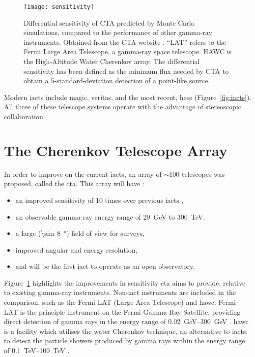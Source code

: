 \begin{figure}
	\centering\texttt{[image: sensitivity]} 
	\caption[Differential sensitivity of CTA.]{Differential sensitivity of CTA predicted by Monte Carlo simulations, compared to the performance of other gamma-ray instruments. Obtained from the CTA website \cite{cta-performance}. ``LAT'' refers to the Fermi Large Area Telescope, a gamma-ray space telescope. HAWC is the High-Altitude Water Cherenkov array. The differential sensitivity has been defined as the minimum flux needed by CTA to obtain a 5-standard-deviation detection of a point-like source.}
	\label{fig:sensitivity}
\end{figure}

Modern \glspl{iact} include \gls{magic}, \gls{veritas}, and the most recent, \gls{hess} (Figure~\ref{fig:iacts}). All three of these telescope systems operate with the advantage of stereoscopic collaboration. 

\section{The Cherenkov Telescope Array}

In order to improve on the current \glspl{iact}, an array of ${\sim} 100$ telescopes was proposed, called the \gls{cta}. This array will have \cite{Acharya2013}:
\begin{itemize}
\item an improved sensitivity of 10 times over previous \glspl{iact} ,
\item an observable gamma-ray energy range of \SI{20}{GeV} to \SI{300}{TeV},
\item a large (\SI{\sim 8}{\degree}) field of view for surveys,
\item improved angular and energy resolution,
\item and will be the first \gls{iact} to operate as an open observatory.
\end{itemize}

Figure~\ref{fig:sensitivity} highlights the improvements in sensitivity \gls{cta} aims to provide, relative to existing gamma-ray instruments. Non-\gls{iact} instruments are included in the comparison, such as the Fermi LAT (Large Area Telescope) and \gls{hawc}. Fermi LAT is the principle instrument on the Fermi Gamma-Ray Satellite, providing direct detection of gamma rays in the energy range of \SIrange{0.02}{300}{GeV} \cite{Atwood2009}. \gls{hawc} is a facility which utilises the water Cherenkov technique, an alternative to \glspl{iact}, to detect the particle showers produced by gamma rays within the energy range of \SIrange{0.1}{100}{TeV} \cite{Abeysekara2013}.


